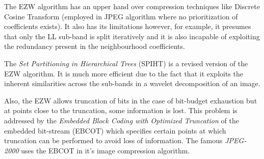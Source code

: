 \documentclass[./A14_Report.tex]{subfiles}
\begin{document}
The EZW algorithm has an upper hand over compression techniques like Discrete
Cosine Transform (employed in JPEG algorithm where no prioritization of
coefficients exists). It also has its limitations however, for example, it
presumes that only the LL sub-band is split iteratively and it is also
incapable of exploiting the redundancy present in the neighbourhood
coefficients.

The \textit{Set Partitioning in Hierarchical Trees} (SPIHT) is a revised version
of the EZW algorithm. It is much more efficient due to the fact that it
exploits the inherent similarities across the sub-bands in a wavelet
decomposition of an image. \cite{sayood_datac}

\par

Also, the EZW allows truncation of bits in the case of bit-budget exhaustion
but at points close to the truncation, some information is lost. This problem
is addressed by the \textit{Embedded Block Coding with Optimized Truncation} of
the embedded bit-stream (EBCOT) which specifies certain points at which
truncation can be performed to avoid loss of information. The famous
\textit{JPEG-2000} uses the EBCOT in it's image compression algorithm.
\cite{sayood_datac}
\end{document}
